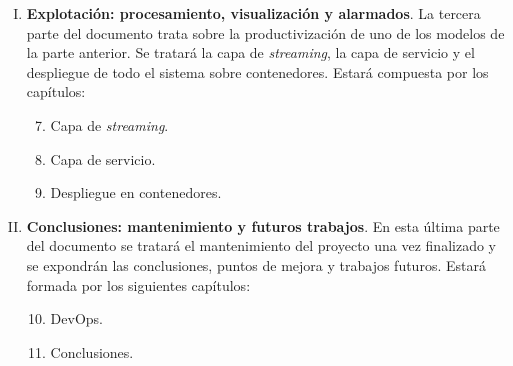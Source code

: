 \begin{enumerate}[I.]
\item \textbf{Explotación: procesamiento, visualización y alarmados}. La tercera parte del documento trata sobre la productivización de uno de los modelos de la parte anterior. Se tratará la capa de \textit{streaming}, la capa de servicio y el despliegue de todo el sistema sobre contenedores.  Estará compuesta por los capítulos:
\begin{enumerate}[1.]
\setcounter{enumii}{6}
\item Capa de \textit{streaming}.
\item Capa de servicio. 
\item Despliegue en contenedores. 
\end{enumerate}
\item \textbf{Conclusiones: mantenimiento y futuros trabajos}. En esta última parte del documento se tratará el mantenimiento del proyecto una vez finalizado y se expondrán las conclusiones, puntos de mejora y trabajos futuros. Estará formada por los siguientes capítulos:
\begin{enumerate}[1.]
\setcounter{enumii}{9}
\item DevOps.
\item Conclusiones. 
\end{enumerate}
\end{enumerate}



